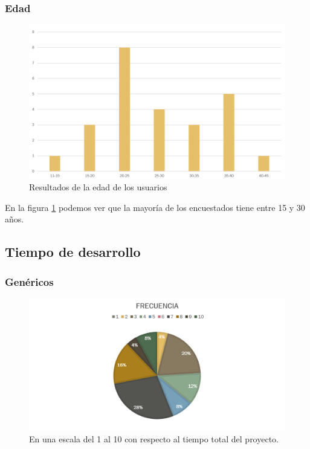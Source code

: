 \documentclass[]{article}
\begin{document}
\subsubsection{Edad}
\begin{figure}[H]
	
	\centering
	\includegraphics[width=1\textwidth]{Encuesta_edad}
	\caption{Resultados de la edad de los usuarios} 
	\label{EDAD}
	
\end{figure}

En la figura \ref{EDAD} podemos ver que la mayor\'ia de los encuestados tiene entre 15 y 30 a\~nos. 


\subsection{Tiempo de desarrollo}

\subsubsection{Gen\'ericos}
\begin{figure}[H]
	
	\centering
	\includegraphics[width=1\textwidth]{Encuesta_tiempo_genericos}
	\caption{En una escala del 1 al 10 con respecto al tiempo total del proyecto.} 
	\label{GENERICO}
	
\end{figure}
\end{document}
